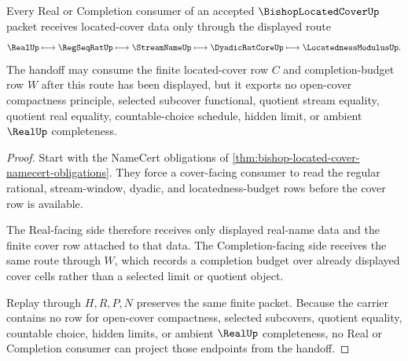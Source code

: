 \begin{theorem}
\label{thm:bishop-located-cover-real-completion-handoff}
Every Real or Completion consumer of an accepted $\BishopLocatedCoverUp$ packet receives located-cover data only through the displayed route
$$
\RealUp \longmapsto \RegSeqRatUp \longmapsto \StreamNameUp \longmapsto \DyadicRatCoreUp \longmapsto \LocatednessModulusUp .
$$
The handoff may consume the finite located-cover row $C$ and completion-budget row $W$ after this route has been displayed, but it exports no open-cover compactness principle, selected subcover functional, quotient stream equality, quotient real equality, countable-choice schedule, hidden limit, or ambient $\RealUp$ completeness.
\end{theorem}
\begin{proof}
Start with the NameCert obligations of \autoref{thm:bishop-located-cover-namecert-obligations}. They force a cover-facing consumer to read the regular rational, stream-window, dyadic, and locatedness-budget rows before the cover row is available.

The Real-facing side therefore receives only displayed real-name data and the finite cover row attached to that data. The Completion-facing side receives the same route through $W$, which records a completion budget over already displayed cover cells rather than a selected limit or quotient object.

Replay through $H,R,P,N$ preserves the same finite packet. Because the carrier contains no row for open-cover compactness, selected subcovers, quotient equality, countable choice, hidden limits, or ambient $\RealUp$ completeness, no Real or Completion consumer can project those endpoints from the handoff.
\end{proof}


\begin{closurestatus}{\BishopLocatedCoverUp}
  \theoryclosure{\seedClosure}
  \formalstatus{\unformalizedV}
\end{closurestatus}
